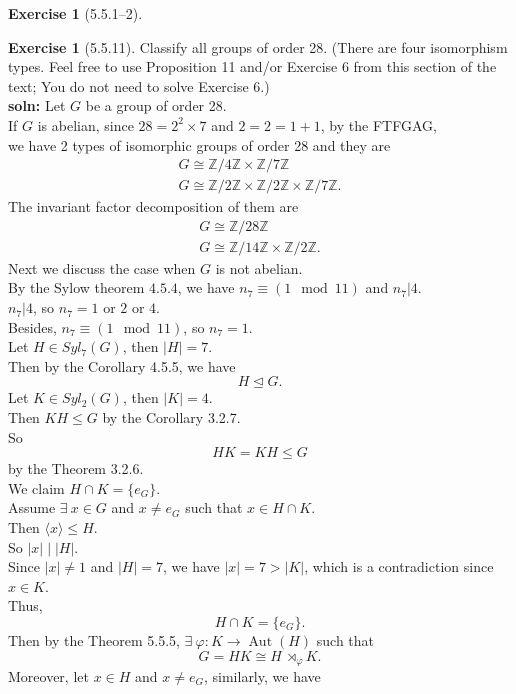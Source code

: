 \documentclass{amsart}
\newcommand{\bbz}{\mathbb{Z}}
\theoremstyle{plain}
\theoremstyle{definition}
\newtheorem{exer}[lem]{Exercise}
\begin{document}
\begin{exer}[5.5.1--2]
\end{exer}

\begin{exer}[5.5.11]
Classify all groups of order 28. (There are four isomorphism types. Feel free to use Proposition 11 and/or Exercise 6 from this section of the text;
You do not need to solve Exercise 6.)\\
\textbf{soln:} Let $G$ be a group of order 28.\\
If $G$ is abelian, since $28 = 2^2\times7$ and $2=2 = 1+1$, by the FTFGAG, \\
we have 2 types of isomorphic groups of order 28 and they are 
\begin{gather*}
	G \cong \bbz/4\bbz \times \bbz/7\bbz\\
	G \cong \bbz/2\bbz \times \bbz/2\bbz  \times \bbz/7\bbz.
\end{gather*}
The invariant factor decomposition of them are 
\begin{gather*}
	G \cong \bbz/28\bbz \\
	G \cong \bbz/14\bbz \times \bbz/2\bbz.	
\end{gather*}
Next we discuss the case when $G$ is not abelian.\\
By the Sylow theorem $4.5.4$, we have $n_7 \equiv (1 \mod{11})$ and $n_7 | 4$.\\
$n_7 | 4$, so $n_7 =1$ or $2$ or $4$.\\
Besides, $n_7 \equiv (1 \mod{11})$, so $n_7 = 1$.\\
Let $H \in Syl_{7}(G)$, then $|H| = 7$.\\
Then by the Corollary 4.5.5, we have 
\[H \unlhd G.\] 
Let $K \in Syl_2(G)$, then $|K| = 4$.\\
Then $KH \leq G$ by the Corollary 3.2.7.\\
So 
\[HK=KH \leq G\] 
by the Theorem 3.2.6.\\
We claim $H\cap K = \{e_G\}$.\\
Assume $\exists\ x \in G$ and $x \neq e_G$ such that $x\in H\cap K$.\\
Then $\langle x \rangle \leq H$.\\
So $|x| \mid |H|$.\\
Since $|x| \neq 1$ and $|H| = 7$, we have $|x| = 7 > |K|$, which is a contradiction since $x \in K$.\\
Thus, 
\[H\cap K = \{e_G\}.\]
Then by the Theorem 5.5.5, $\exists\ \varphi:K \to \operatorname{Aut}(H)$ such that 
\[G=HK \cong H\ \rtimes_\varphi K. \]
Moreover, let $x \in H$ and $x \neq e_G$, similarly, we have 

\end{exer}
\end{document}

